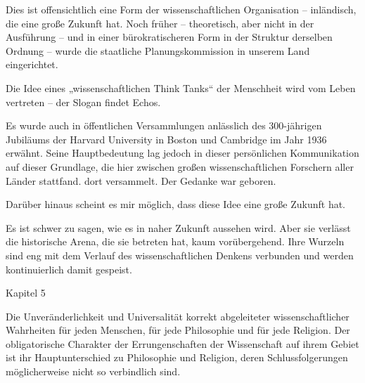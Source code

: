 \documentclass[11pt,a4paper]{book}
\begin{document}
Dies ist offensichtlich eine Form der wissenschaftlichen Organisation -- inländisch, die eine große Zukunft hat. Noch früher -- theoretisch, aber nicht in der Ausführung -- und in einer bürokratischeren Form in der Struktur derselben Ordnung -- wurde die staatliche Planungskommission in unserem Land eingerichtet.



Die Idee eines „wissenschaftlichen Think Tanks“ der Menschheit wird vom Leben vertreten -- der Slogan findet Echos.



Es wurde auch in öffentlichen Versammlungen anlässlich des 300-jährigen Jubiläums der Harvard University in Boston und Cambridge im Jahr 1936 erwähnt. Seine Hauptbedeutung lag jedoch in dieser persönlichen Kommunikation auf dieser Grundlage, die hier zwischen großen wissenschaftlichen Forschern aller Länder stattfand. dort versammelt. Der Gedanke war geboren.



Darüber hinaus scheint es mir möglich, dass diese Idee eine große Zukunft hat.



Es ist schwer zu sagen, wie es in naher Zukunft aussehen wird. Aber sie verlässt die historische Arena, die sie betreten hat, kaum vorübergehend. Ihre Wurzeln sind eng mit dem Verlauf des wissenschaftlichen Denkens verbunden und werden kontinuierlich damit gespeist.



Kapitel 5



 



Die Unveränderlichkeit und Universalität korrekt abgeleiteter wissenschaftlicher Wahrheiten für jeden Menschen, für jede Philosophie und für jede Religion. Der obligatorische Charakter der Errungenschaften der Wissenschaft auf ihrem Gebiet ist ihr Hauptunterschied zu Philosophie und Religion, deren Schlussfolgerungen möglicherweise nicht so verbindlich sind.



 
\end{document}
